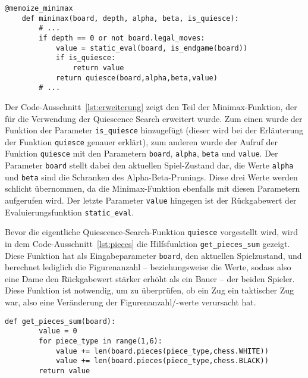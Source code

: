 \begin{lstlisting}[caption=Erweiterung der Funktion des Minimax-Algorithmus für die Verwendung von Quiescence Search, label=lst:erweiterung]
	@memoize_minimax
	def minimax(board, depth, alpha, beta, is_quiesce):
		# ...
		if depth == 0 or not board.legal_moves:
			value = static_eval(board, is_endgame(board))
			if is_quiesce:
				return value
			return quiesce(board,alpha,beta,value)
		# ...
\end{lstlisting}

Der Code-Ausschnitt~\ref{lst:erweiterung} zeigt den Teil der Minimax-Funktion, der für die Verwendung der Quiescence Search erweitert wurde. Zum einen wurde der Funktion der Parameter \texttt{is_quiesce} hinzugefügt (dieser wird bei der Erläuterung der Funktion \texttt{quiesce} genauer erklärt), zum anderen wurde der Aufruf der Funktion \texttt{quiesce} mit den Parametern \texttt{board}, \texttt{alpha}, \texttt{beta} und \texttt{value}. Der Parameter \texttt{board} stellt dabei den aktuellen Spiel-Zustand dar, die Werte \texttt{alpha} und \texttt{beta} sind die Schranken des Alpha-Beta-Prunings. Diese drei Werte werden schlicht übernommen, da die Minimax-Funktion ebenfalls mit diesen Parametern aufgerufen wird. Der letzte Parameter \texttt{value} hingegen ist der Rückgabewert der Evaluierungsfunktion \texttt{static_eval}.

Bevor die eigentliche Quiescence-Search-Funktion \texttt{quiesce} vorgestellt wird, wird in dem Code-Ausschnitt~\ref{lst:pieces} die Hilfsfunktion \texttt{get_pieces_sum} gezeigt. Diese Funktion hat als Eingabeparameter \texttt{board}, den aktuellen Spielzustand, und berechnet lediglich die Figurenanzahl -- beziehungsweise die Werte, sodass also eine Dame den Rückgabewert stärker erhöht als ein Bauer -- der beiden Spieler. Diese Funktion ist notwendig, um zu überprüfen, ob ein Zug ein taktischer Zug war, also eine Veränderung der Figurenanzahl/-werte verursacht hat.

\begin{lstlisting}[caption=Hilfsfunktion für die Differenzierung taktischer Züge, label=lst:pieces]
	def get_pieces_sum(board):
    	value = 0
    	for piece_type in range(1,6):
        	value += len(board.pieces(piece_type,chess.WHITE))
        	value += len(board.pieces(piece_type,chess.BLACK))
    	return value
\end{lstlisting}


